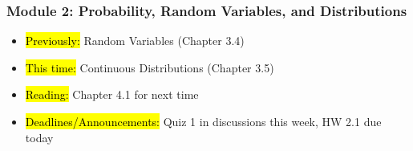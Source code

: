 
\begin{frame}
    \frametitle{Module 2: Probability, Random Variables, and Distributions}
    \begin{itemize}
        \item \hl{Previously: } Random Variables (Chapter 3.4)
        \item \hl{This time: } Continuous Distributions (Chapter 3.5)
        \item \hl{Reading: } Chapter 4.1 for next time
        \item \hl{Deadlines/Announcements: } Quiz 1 in discussions this week, HW 2.1 due today
    \end{itemize}
    
\end{frame}
    